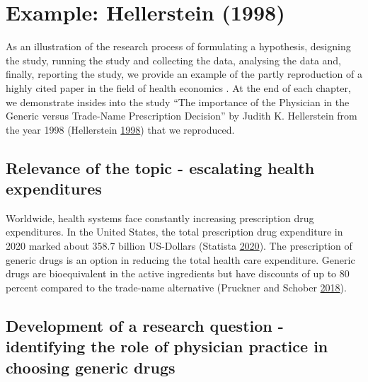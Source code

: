 \documentclass[
]{book}
\begin{document}
\hypertarget{example-hellerstein-1998}{%
\section{Example: Hellerstein (1998)}\label{example-hellerstein-1998}}

As an illustration of the research process of formulating a hypothesis,
designing the study, running the study and collecting the data,
analysing the data and, finally, reporting the study, we provide an
example of the partly reproduction of a highly cited paper in the field
of health economics . At the end of each chapter, we demonstrate insides
into the study ``The importance of the Physician in the Generic versus
Trade-Name Prescription Decision'' by Judith K. Hellerstein from the
year 1998 (Hellerstein
\protect\hyperlink{ref-hellerstein_importance_1998}{1998}) that we
reproduced.

\hypertarget{relevance-of-the-topic---escalating-health-expenditures}{%
\subsection{\texorpdfstring{\textbf{Relevance of the topic - escalating
health
expenditures}}{Relevance of the topic - escalating health expenditures}}\label{relevance-of-the-topic---escalating-health-expenditures}}

Worldwide, health systems face constantly increasing prescription drug
expenditures. In the United States, the total prescription drug
expenditure in 2020 marked about 358.7 billion US-Dollars (Statista
\protect\hyperlink{ref-statista_prescription_2020}{2020}). The
prescription of generic drugs is an option in reducing the total health
care expenditure. Generic drugs are bioequivalent in the active
ingredients but have discounts of up to 80 percent compared to the
trade-name alternative (Pruckner and Schober
\protect\hyperlink{ref-pruckner_hospitals_2018}{2018}).

\hypertarget{development-of-a-research-question---identifying-the-role-of-physician-practice-in-choosing-generic-drugs}{%
\subsection{\texorpdfstring{\textbf{Development of a research question -
identifying the role of physician practice in choosing generic
drugs}}{Development of a research question - identifying the role of physician practice in choosing generic drugs}}\label{development-of-a-research-question---identifying-the-role-of-physician-practice-in-choosing-generic-drugs}}
\end{document}
